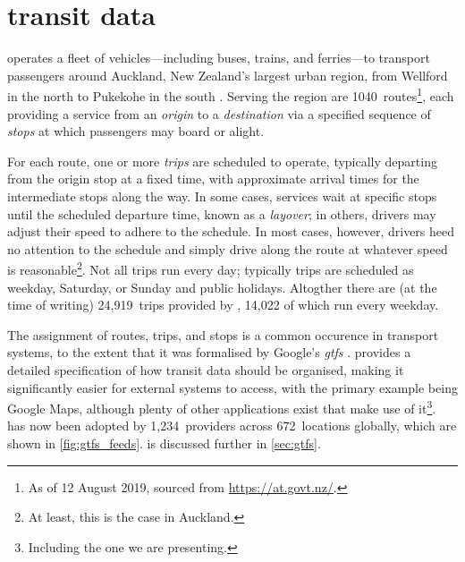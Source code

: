 \chapter{\Rt{} transit data}
\label{cha:data}

\begin{knitrout}\small
{}\color{fgcolor}\begin{kframe}


{\ttfamily\noindent\itshape\color{messagecolor}{\#\# Loading required namespace: transitr}}\end{kframe}
\end{knitrout}

\AT{} operates a fleet of vehicles---including buses, trains, and ferries---to transport passengers around Auckland, New Zealand's largest urban region, from Wellford in the north to Pukekohe in the south \citep{cn}. Serving the region are 1040~routes\footnote{As of 12 August 2019, sourced from \url{https://at.govt.nz/}.}, each providing a service from an \emph{origin} to a \emph{destination} via a specified sequence of \emph{stops} at which passengers may board or alight.


For each route, one or more \emph{trips} are scheduled to operate, typically departing from the origin stop at a fixed time, with approximate arrival times for the intermediate stops along the way. In some cases, services wait at specific stops until the scheduled departure time, known as a \emph{layover}; in others, drivers may adjust their speed to adhere to the schedule. In most cases, however, drivers heed no attention to the schedule and simply drive along the route at whatever speed is reasonable\footnote{At least, this is the case in Auckland.}. Not all trips run every day; typically trips are scheduled as weekday, Saturday, or Sunday and public holidays. Altogther there are (at the time of writing) 24,919~trips provided by \AT{}, 14,022 of which run every weekday.


The assignment of routes, trips, and stops is a common occurence in transport systems, to the extent that it was formalised by Google's \emph{\acrfull{gtfs}} \citep {GoogleDevelopers_2006}. \GTFS{} provides a detailed specification of how transit data should be organised, making it significantly easier for external systems to access, with the primary example being Google Maps, although plenty of other applications exist that make use of it\footnote{Including the one we are presenting.}. \GTFS{} has now been adopted by 1,234~providers across 672~locations globally, which are shown in \cref{fig:gtfs_feeds}. \GTFS{} is discussed further in \cref{sec:gtfs}.

